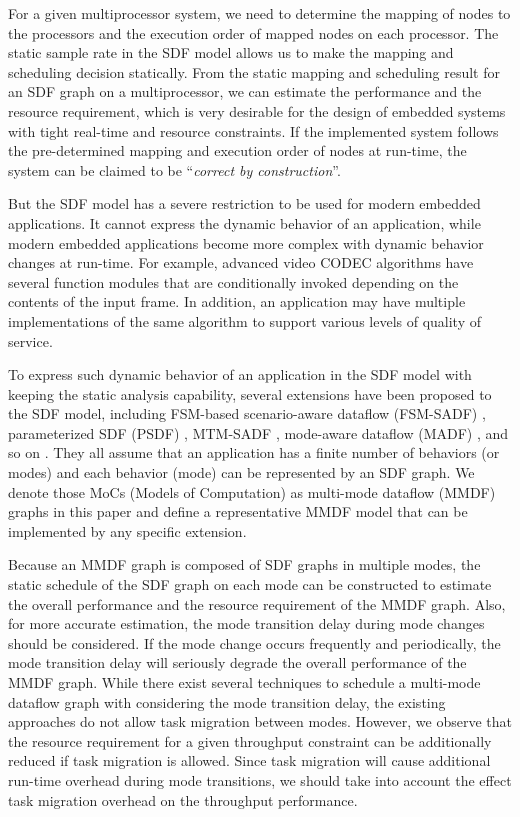 \documentclass[prodmode,acmtecs]{acmsmall}
\begin{document}
For a given multiprocessor system, we need to determine the mapping of nodes to the processors and the execution order of mapped nodes on each processor. The static sample rate in the SDF model allows us to make the mapping and scheduling decision statically. From the static mapping and scheduling result for an SDF graph on a multiprocessor, we can estimate the performance and the resource requirement, which is very desirable for the design of embedded systems with tight real-time and resource constraints. If the implemented system follows the pre-determined mapping and execution order of nodes at run-time, the system can be claimed to be ``\textit{correct by construction}''.

But the SDF model has a severe restriction to be used for modern embedded applications. It cannot express the dynamic behavior of an application, while modern embedded applications become more complex with dynamic behavior changes at run-time. For example, advanced video CODEC algorithms have several function modules that are conditionally invoked depending on the contents of the input frame. In addition, an application may have multiple implementations of the same algorithm to support various levels of quality of service.

To express such dynamic behavior of an application in the SDF model with keeping the static analysis capability, several extensions have been proposed to the SDF model, including FSM-based scenario-aware dataflow (FSM-SADF) \cite{Stuijk:2011}, parameterized SDF (PSDF) \cite{Bhattacharya:2001}, MTM-SADF \cite{Jung:2014}, mode-aware dataflow (MADF) \cite{Zhai:2015}, and so on \cite{Girault:1999} \cite{Wiggers:2008}. They all assume that an application has a finite number of behaviors (or modes) and each behavior (mode) can be represented by an SDF graph. We denote those MoCs (Models of Computation) as multi-mode dataflow (MMDF) graphs in this paper and define a representative MMDF model that can be implemented by any specific extension.

Because an MMDF graph is composed of SDF graphs in multiple modes, the static schedule of the SDF graph on each mode can be constructed to estimate the overall performance and the resource requirement of the MMDF graph. Also, for more accurate estimation, the mode transition delay during mode changes should be considered. If the mode change occurs frequently and periodically, the mode transition delay will seriously degrade the overall performance of the MMDF graph. While there exist several techniques to schedule a multi-mode dataflow graph with considering the mode transition delay, the existing approaches do not allow task migration between modes. However, we observe that the resource requirement for a given throughput constraint can be additionally reduced if task migration is allowed. Since task migration will cause additional run-time overhead during mode transitions, we should take into account the effect task migration overhead on the throughput performance.
\end{document}
